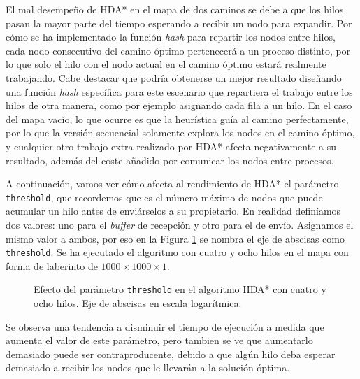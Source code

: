 \documentclass[a4paper,12pt]{article}
\begin{document}
El mal desempeño de HDA* en el mapa de dos caminos se debe a que los hilos pasan la mayor parte del tiempo esperando a recibir un nodo para expandir. Por cómo se ha implementado la función \textit{hash} para repartir los nodos entre hilos, cada nodo consecutivo del camino óptimo pertenecerá a un proceso distinto, por lo que solo el hilo con el nodo actual en el camino óptimo estará realmente trabajando. Cabe destacar que podría obtenerse un mejor resultado diseñando una función \textit{hash} específica para este escenario que repartiera el trabajo entre los hilos de otra manera, como por ejemplo asignando cada fila a un hilo. En el caso del mapa vacío, lo que ocurre es que la heurística guía al camino perfectamente, por lo que la versión secuencial solamente explora los nodos en el camino óptimo, y cualquier otro trabajo extra realizado por HDA* afecta negativamente a su resultado, además del coste añadido por comunicar los nodos entre procesos.

A continuación, vamos ver cómo afecta al rendimiento de HDA* el parámetro \verb|threshold|, que recordemos que es el número máximo de nodos que puede acumular un hilo antes de enviárselos a su propietario. En realidad definíamos dos valores: uno para el \textit{buffer} de recepción y otro para el de envío. Asignamos el mismo valor a ambos, por eso en la Figura \ref{fig:threshold} se nombra el eje de abscisas como \verb|threshold|. Se ha ejecutado el algoritmo con cuatro y ocho hilos en el mapa con forma de laberinto de $1000 \times 1000 \times 1$.

\begin{figure}[H]
    \centering
    \begin{subfigure}[b]{0.49\textwidth}
        
    \end{subfigure}
    \hfill
    \begin{subfigure}[b]{0.49\textwidth}
        
    \end{subfigure}

    \caption{Efecto del parámetro \texttt{threshold} en el algoritmo HDA* con cuatro y ocho hilos. Eje de abscisas en escala logarítmica.}
    \label{fig:threshold}
\end{figure}

Se observa una tendencia a disminuir el tiempo de ejecución a medida que aumenta el valor de este parámetro, pero tambien se ve que aumentarlo demasiado puede ser contraproducente, debido a que algún hilo deba esperar demasiado a recibir los nodos que le llevarán a la solución óptima.
\end{document}
